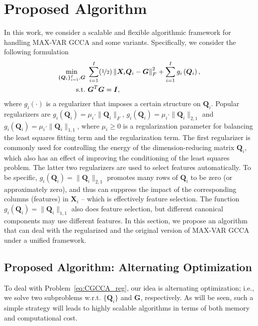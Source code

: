 \documentclass[10pt,journal]{IEEEtran}
\newcommand{\G}{\boldsymbol{G}}
\newcommand{\Q}{\boldsymbol{Q}}
\newcommand{\X}{\boldsymbol{X}}
\begin{document}
\section{Proposed Algorithm}
In this work, we consider a scalable and flexible algorithmic framework for handling MAX-VAR GCCA and some variants. Specifically, we consider the following formulation
\begin{equation}\label{eq:CGCCA_reg}
\begin{aligned}
\min_{\{{\bm Q}_i\}_{i=1}^I,\G} &~\sum_{i=1}^{I}(\nicefrac{1}{2})\left\|{\bm X}_i{\bm Q}_i-{\bm G}\right\|_F^2+\sum_{i=1}^I  g_i\left(\Q_i\right),\\
{\rm s.t.}&~{\bm G}^T{\bm G}={\bm I},
\end{aligned}
\end{equation}
where $g_i(\cdot)$ is a regularizer that imposes a certain structure on $\Q_i$.
Popular regularizers are $g_i(\Q_i)=\mu_i\cdot\|\Q_i\|_{F}$, $g_i(\Q_i)=\mu_i\cdot\|\Q_i\|_{2,1}$ and $g_i(\Q_i)=\mu_i\cdot\|\Q_i\|_{1,1}$, where $\mu_i\geq 0$ is a regularization parameter for balancing the least squares fitting term and the regularization term.
The first regularizer is commonly used for controlling the energy of the dimension-reducing matrix $\Q_i$, which also has an effect of improving the conditioning of the least squares problem.
The latter two regularizers are used to select features automatically. To be specific,  $g_i(\Q_i)=\|\Q_i\|_{2,1}$ promotes many rows of $\Q_i$ to be zero (or approximately zero), and thus can suppress the impact of the corresponding columns (features) in $\X_i$ -- which is effectively feature selection.
The function $g_i(\Q_i)=\|\Q_i\|_{1,1}$ also does feature selection, but different canonical components may use different features.
In this section, we propose an algorithm that can deal with the regularized and the original version of MAX-VAR GCCA under a unified framework.

\subsection{Proposed Algorithm: Alternating Optimization}
To deal with Problem~\eqref{eq:CGCCA_reg}, our idea is alternating optimization; i.e.,
we solve two subproblems w.r.t. $\{\Q_i\}$ and $\G$, respectively.
As will be seen, such a simple strategy will leads to highly scalable algorithms in terms of both memory and computational cost.
\end{document}
